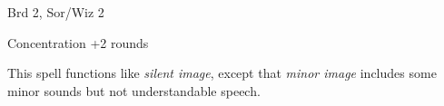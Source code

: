 
\begin{description*}
\item[Level:] Brd 2, Sor/Wiz 2
\item[Duration:] Concentration +2 rounds
\end{description*}

This spell functions like \textit{silent image}, except that \textit{minor image
}includes some minor sounds but not understandable speech.